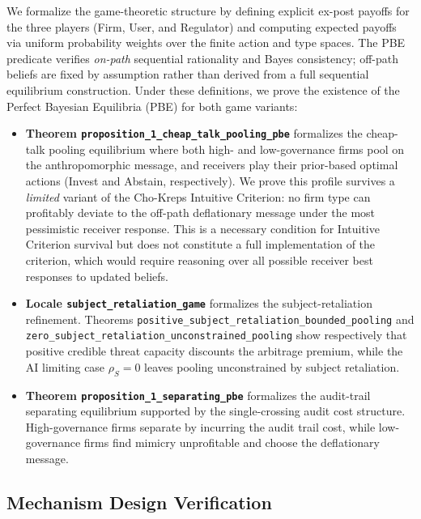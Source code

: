 We formalize the game-theoretic structure by defining explicit ex-post payoffs for the three players (Firm, User, and Regulator) and computing expected payoffs via uniform probability weights over the finite action and type spaces. The PBE predicate verifies \emph{on-path} sequential rationality and Bayes consistency; off-path beliefs are fixed by assumption rather than derived from a full sequential equilibrium construction. Under these definitions, we prove the existence of the Perfect Bayesian Equilibria (PBE) for both game variants:
\begin{itemize}
    \item \textbf{Theorem \texttt{proposition\_\allowbreak{}1\_\allowbreak{}cheap\_\allowbreak{}talk\_\allowbreak{}pooling\_\allowbreak{}pbe}} formalizes the cheap-talk pooling equilibrium where both high- and low-governance firms pool on the anthropomorphic message, and receivers play their prior-based optimal actions (Invest and Abstain, respectively). We prove this profile survives a \emph{limited} variant of the Cho-Kreps Intuitive Criterion: no firm type can profitably deviate to the off-path deflationary message under the most pessimistic receiver response. This is a necessary condition for Intuitive Criterion survival but does not constitute a full implementation of the criterion, which would require reasoning over all possible receiver best responses to updated beliefs.
    \item \textbf{Locale \texttt{subject\_\allowbreak{}retaliation\_\allowbreak{}game}} formalizes the subject-retaliation refinement. Theorems \texttt{positive\_\allowbreak{}subject\_\allowbreak{}retaliation\_\allowbreak{}bounded\_\allowbreak{}pooling} and \texttt{zero\_\allowbreak{}subject\_\allowbreak{}retaliation\_\allowbreak{}unconstrained\_\allowbreak{}pooling} show respectively that positive credible threat capacity discounts the arbitrage premium, while the AI limiting case $\rho_S=0$ leaves pooling unconstrained by subject retaliation.
    \item \textbf{Theorem \texttt{proposition\_\allowbreak{}1\_\allowbreak{}separating\_\allowbreak{}pbe}} formalizes the audit-trail separating equilibrium supported by the single-crossing audit cost structure. High-governance firms separate by incurring the audit trail cost, while low-governance firms find mimicry unprofitable and choose the deflationary message.
\end{itemize}

\subsection*{Mechanism Design Verification}

